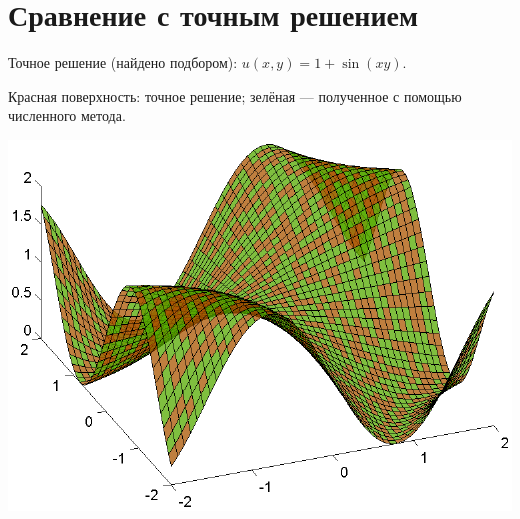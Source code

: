 \documentclass[12pt]{article}
\theoremstyle{rusdef}
\begin{document}
	\section{Сравнение с точным решением}
	
	Точное решение (найдено подбором): $u(x,y)=1+\sin(xy)$.
	
	Красная поверхность: точное решение; зелёная --- полученное с помощью численного метода.

	\includegraphics{plot.eps}\\
	
\end{document}
